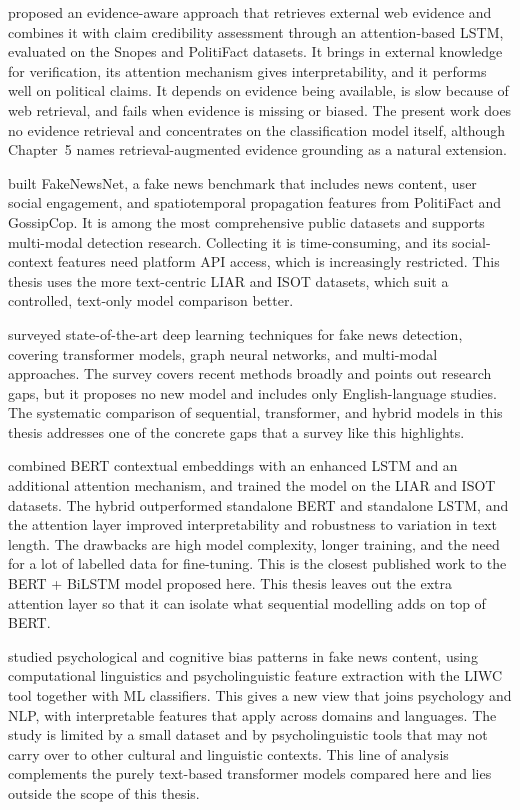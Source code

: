 \citep{Popat2019DeClarE} proposed an evidence-aware approach that retrieves external web evidence and combines it with claim credibility assessment through an attention-based LSTM, evaluated on the Snopes and PolitiFact datasets. It brings in external knowledge for verification, its attention mechanism gives interpretability, and it performs well on political claims. It depends on evidence being available, is slow because of web retrieval, and fails when evidence is missing or biased. The present work does no evidence retrieval and concentrates on the classification model itself, although Chapter~5 names retrieval-augmented evidence grounding as a natural extension.

\citep{Shu2020FakeNewsNet} built FakeNewsNet, a fake news benchmark that includes news content, user social engagement, and spatiotemporal propagation features from PolitiFact and GossipCop. It is among the most comprehensive public datasets and supports multi-modal detection research. Collecting it is time-consuming, and its social-context features need platform API access, which is increasingly restricted. This thesis uses the more text-centric LIAR and ISOT datasets, which suit a controlled, text-only model comparison better.

\citep{Mehta2022RecentTrends} surveyed state-of-the-art deep learning techniques for fake news detection, covering transformer models, graph neural networks, and multi-modal approaches. The survey covers recent methods broadly and points out research gaps, but it proposes no new model and includes only English-language studies. The systematic comparison of sequential, transformer, and hybrid models in this thesis addresses one of the concrete gaps that a survey like this highlights.

\citep{Rai2022FakeNews} combined BERT contextual embeddings with an enhanced LSTM and an additional attention mechanism, and trained the model on the LIAR and ISOT datasets. The hybrid outperformed standalone BERT and standalone LSTM, and the attention layer improved interpretability and robustness to variation in text length. The drawbacks are high model complexity, longer training, and the need for a lot of labelled data for fine-tuning. This is the closest published work to the BERT + BiLSTM model proposed here. This thesis leaves out the extra attention layer so that it can isolate what sequential modelling adds on top of BERT.

\citep{CarrascoFarre2022Fingerprints} studied psychological and cognitive bias patterns in fake news content, using computational linguistics and psycholinguistic feature extraction with the LIWC tool together with ML classifiers. This gives a new view that joins psychology and NLP, with interpretable features that apply across domains and languages. The study is limited by a small dataset and by psycholinguistic tools that may not carry over to other cultural and linguistic contexts. This line of analysis complements the purely text-based transformer models compared here and lies outside the scope of this thesis.

